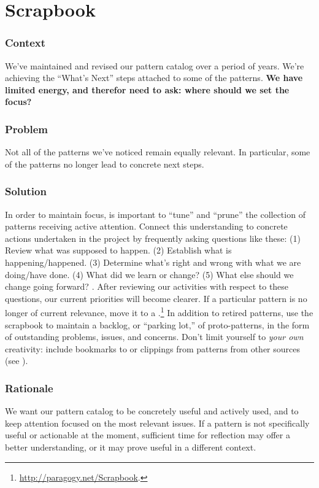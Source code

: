 \section{Scrapbook} \label{sec:Scrapbook}

\subsubsection*{Context} We've maintained and revised our pattern catalog over a period of years.  We're achieving
the ``What's Next'' steps attached to some of the patterns.
\textbf{We have limited energy, and therefor need to ask: where should we set the focus?}

\subsubsection*{Problem} Not all of the patterns we've noticed remain equally relevant.  In particular, some of the patterns no longer lead to concrete next steps.

\subsubsection*{Solution} In order to maintain focus, is important to ``tune'' and ``prune'' the collection of patterns receiving active attention.  Connect this understanding to concrete actions undertaken in the project by frequently asking questions like these:
(1) Review what was supposed to happen.
(2) Establish what is happening/happened.
(3) Determine what’s right and wrong with what we are doing/have done.
(4) What did we learn or change? 
(5) What else should we change going forward?  \cite[Chapter 28]{peeragogy-handbook}.
%
After reviewing our activities with respect to these questions, our
current priorities will become clearer.  If a particular pattern is no
longer of current relevance, move it to a
.\footnote{\url{http://paragogy.net/Scrapbook}.}  
%
In addition to retired patterns, use the scrapbook to maintain a
backlog, or ``parking lot,'' of proto-patterns, in the form of
outstanding problems, issues, and concerns.  Don't limit yourself to
\emph{your own} creativity: include bookmarks to or clippings from
patterns from other sources (see ).

\subsubsection*{Rationale} 
We want our pattern catalog to be concretely useful and actively used,
and to keep attention focused on the most relevant issues.
If a pattern is not specifically useful or actionable at the
moment, sufficient time for reflection may offer a better
understanding, or it may prove useful in a different context.

